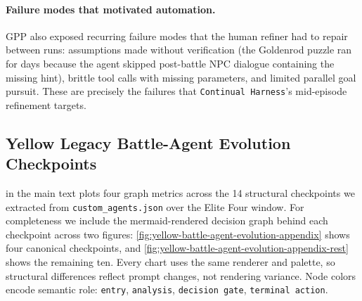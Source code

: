 \paragraph{Failure modes that motivated automation.} GPP also exposed recurring failure modes that the human refiner had to repair between runs: assumptions made without verification (the Goldenrod puzzle ran for days because the agent skipped post-battle NPC dialogue containing the missing hint), brittle tool calls with missing parameters, and limited parallel goal pursuit. These are precisely the failures that \texttt{Continual Harness}'s mid-episode refinement targets.

\subsection{Yellow Legacy Battle-Agent Evolution Checkpoints}\label{app:battle-agent-evolution}

 in the main text plots four graph metrics across the 14 structural checkpoints we extracted from \texttt{custom\_agents.json} over the Elite Four window. For completeness we include the mermaid-rendered decision graph behind each checkpoint across two figures: \cref{fig:yellow-battle-agent-evolution-appendix} shows four canonical checkpoints, and \cref{fig:yellow-battle-agent-evolution-appendix-rest} shows the remaining ten. Every chart uses the same renderer and palette, so structural differences reflect prompt changes, not rendering variance. Node colors encode semantic role: \colorbox[HTML]{CFE4D4}{\texttt{entry}}, \colorbox[HTML]{EEEEEE}{\texttt{analysis}}, \colorbox[HTML]{BED3E5}{\texttt{decision gate}}, \colorbox[HTML]{F4C6AC}{\texttt{terminal action}}.

